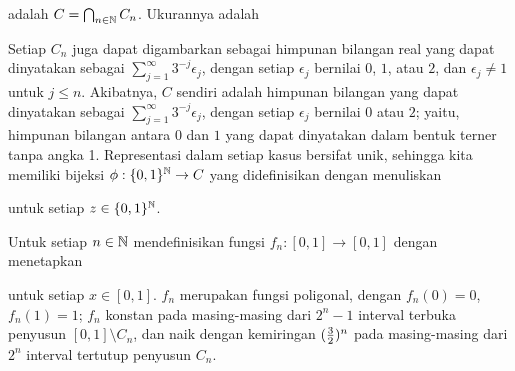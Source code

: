 \medskip

 adalah
$C=\bigcap_{n\in\Bbb N}C_n$. Ukurannya adalah


 Setiap $C_n$ juga dapat digambarkan sebagai
himpunan bilangan real yang dapat dinyatakan sebagai
$\sum_{j=1}^{\infty}3^{-j}\epsilon_j$, dengan setiap $\epsilon_j$ bernilai
$0$, $1$, atau $2$, dan $\epsilon_j\ne 1$ untuk $j\le n$. Akibatnya, $C$
sendiri adalah himpunan bilangan yang dapat dinyatakan sebagai
$\sum_{j=1}^{\infty}3^{-j}\epsilon_j$, dengan setiap $\epsilon_j$ bernilai
$0$ atau $2$; yaitu, himpunan bilangan antara $0$ dan $1$ yang dapat
dinyatakan dalam bentuk terner tanpa angka 1. Representasi dalam setiap kasus
bersifat unik, sehingga kita memiliki bijeksi
$\phi:\{0,1\}^{\Bbb N}\to C$ yang didefinisikan dengan menuliskan


\noindent untuk setiap $z\in\{0,1\}^{\Bbb N}$.

 Untuk setiap $n\in\Bbb N$ mendefinisikan fungsi
$f_n:[0,1]\to[0,1]$ dengan menetapkan


\noindent untuk setiap $x\in [0,1]$.  $f_n$ merupakan fungsi poligonal, dengan
$f_n(0)=0$, $f_n(1)=1$; $f_n$ konstan pada masing-masing dari $2^n-1$ interval
terbuka penyusun $[0,1]\setminus C_n$, dan naik dengan kemiringan
$({3\over 2})^n$ pada masing-masing dari $2^n$ interval tertutup penyusun $C_n$.


